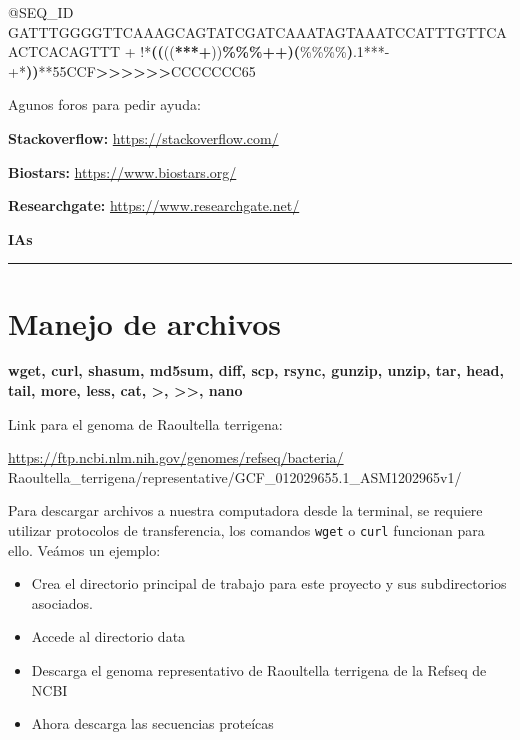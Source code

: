 \documentclass[
]{book}
\newenvironment{Shaded}{\begin{snugshade}}{\end{snugshade}}
\newcommand{\ErrorTok}[1]{\textcolor[rgb]{0.64,0.00,0.00}{\textbf{#1}}}
\newcommand{\ExtensionTok}[1]{#1}
\newcommand{\KeywordTok}[1]{\textcolor[rgb]{0.13,0.29,0.53}{\textbf{#1}}}
\newcommand{\NormalTok}[1]{#1}
\newcommand{\OperatorTok}[1]{\textcolor[rgb]{0.81,0.36,0.00}{\textbf{#1}}}
\newcommand{\StringTok}[1]{\textcolor[rgb]{0.31,0.60,0.02}{#1}}
\begin{document}
\begin{Shaded}
\begin{Highlighting}[]
\ExtensionTok{@SEQ\_ID}
\ExtensionTok{GATTTGGGGTTCAAAGCAGTATCGATCAAATAGTAAATCCATTTGTTCAACTCACAGTTT}
\ExtensionTok{+}
\ExtensionTok{!}\StringTok{\textquotesingle{}\textquotesingle{}}\ExtensionTok{*}\ErrorTok{((}\NormalTok{((}\OperatorTok{***+}\NormalTok{))}\OperatorTok{\%\%\%++}\KeywordTok{)(}\ExtensionTok{\%\%\%\%}\KeywordTok{)}\ExtensionTok{.1***{-}+*}\StringTok{\textquotesingle{}\textquotesingle{}}\KeywordTok{)}\ErrorTok{)}\ExtensionTok{**55CCF}\OperatorTok{\textgreater{}\textgreater{}\textgreater{}\textgreater{}\textgreater{}\textgreater{}}\NormalTok{CCCCCCC65}
\end{Highlighting}
\end{Shaded}

Agunos foros para pedir ayuda:

\textbf{Stackoverflow:} \url{https://stackoverflow.com/}

\textbf{Biostars:} \url{https://www.biostars.org/}

\textbf{Researchgate:} \url{https://www.researchgate.net/}

\textbf{IAs}

\begin{center}\rule{0.5\linewidth}{0.5pt}\end{center}

\section{Manejo de archivos}\label{manejo-de-archivos-1}

\textbf{wget, curl, shasum, md5sum, diff, scp, rsync, gunzip, unzip, tar, head, tail, more, less, cat, \textgreater, \textgreater\textgreater, nano}

Link para el genoma de Raoultella terrigena:

\url{https://ftp.ncbi.nlm.nih.gov/genomes/refseq/bacteria/}
Raoultella\_terrigena/representative/GCF\_012029655.1\_ASM1202965v1/

Para descargar archivos a nuestra computadora desde la terminal, se requiere utilizar protocolos de transferencia, los comandos \texttt{wget} o \texttt{curl} funcionan para ello. Veámos un ejemplo:

\begin{itemize}
\item
  Crea el directorio principal de trabajo para este proyecto y sus subdirectorios asociados.
\item
  Accede al directorio data
\item
  Descarga el genoma representativo de Raoultella terrigena de la Refseq de NCBI
\item
  Ahora descarga las secuencias proteícas
\end{itemize}
\end{document}
